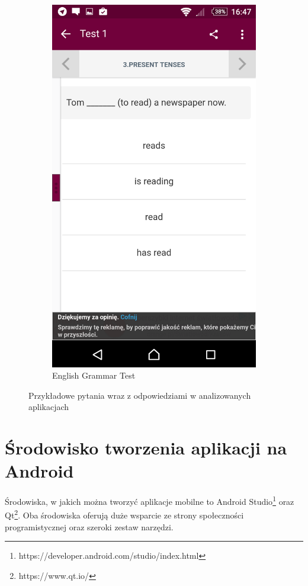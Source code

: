 \documentclass[eng]{mgr}
\begin{document}
\begin{figure}[ht]
\begin{subfigure}{.3\textwidth}
				\includegraphics[width=.7\linewidth]{English_Grammar_Test.png}
				\caption{English Grammar Test}
				\label{fig:english_grammar_test}
			\end{subfigure}
			\caption{Przykładowe pytania wraz z odpowiedziami w analizowanych aplikacjach}
			\label{fig:przykladowe_aplikacje}
		\end{figure}
	
		\section{Środowisko tworzenia aplikacji na Android}
		Środowiska, w jakich można tworzyć aplikacje mobilne to Android Studio\footnote{https://developer.android.com/studio/index.html} oraz Qt\footnote{https://www.qt.io/}. Oba środowiska oferują duże wsparcie ze strony społeczności programistycznej oraz szeroki zestaw narzędzi.
		
\end{document}
